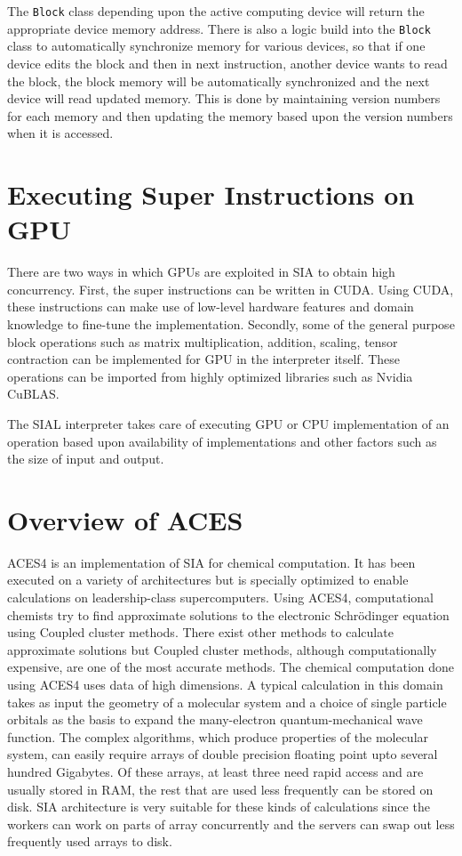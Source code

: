 The \texttt{Block} class depending upon the active computing device will return the
appropriate device memory address. There is also a logic build into the \texttt{Block}
class to automatically synchronize memory for various devices, so that if one
device edits the block and then in next instruction, another device wants
to read the block, the block memory will be automatically synchronized and the
next device will read updated memory. This is done by maintaining version numbers
for each memory and then updating the memory based upon the version numbers when
it is accessed.

\section{Executing Super Instructions on GPU}
There are two ways in which GPUs are exploited in SIA to obtain high concurrency.
First, the super instructions can be written in CUDA.
Using CUDA, these instructions can make use of low-level hardware
features and domain knowledge to fine-tune the implementation. Secondly, some of
the general purpose block operations such as matrix multiplication, addition,
scaling, tensor contraction can be implemented for GPU in the interpreter
itself. These operations can be imported from highly optimized libraries such as
Nvidia CuBLAS.

The SIAL interpreter takes care of executing GPU or CPU implementation of an
operation based upon availability of implementations and other factors such as
the size of input and output.

\section{Overview of ACES}
ACES4 is an implementation of SIA for chemical computation. It has been executed
on a variety of architectures but is specially optimized to enable
calculations on leadership-class supercomputers. Using ACES4, computational chemists
try to find approximate solutions to the electronic Schrödinger equation using Coupled cluster
methods. There exist other methods to calculate approximate solutions but Coupled
cluster methods, although computationally expensive, are one of the most accurate methods.
The chemical computation done using ACES4 uses data of high dimensions. A typical calculation in this domain
takes as input the geometry of a molecular system and a choice of single
particle orbitals as the basis to expand the many-electron quantum-mechanical wave
function. The complex algorithms, which produce properties of the molecular
system, can easily require arrays of double precision floating point upto
several hundred Gigabytes. Of these arrays, at least three need rapid access and
are usually stored in RAM, the rest that are used less frequently can be stored
on disk. SIA architecture is very suitable for these kinds of calculations since
the workers can work on parts of array concurrently and the servers can swap out
less frequently used arrays to disk.
